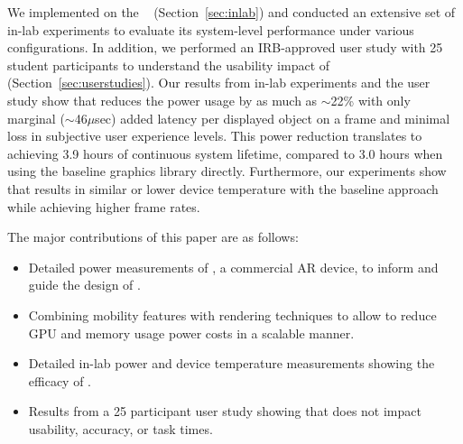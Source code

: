 We implemented {\myit} on the {\mlo}~\cite{magicleapone} (Section~\ref{sec:inlab})
and conducted an extensive set of in-lab experiments to evaluate its
system-level performance under various configurations.
%
In addition, we performed an IRB-approved user study with 25 student participants
to understand the usability impact of {\myit} (Section~\ref{sec:userstudies}).
%
%
Our results from in-lab experiments and the user study show that {\myit}
reduces the power usage by as much as $\sim$22\% 
with only marginal ($\sim$46$\mu$sec) added latency per displayed 
object on a frame and minimal loss in subjective user experience levels.
%
This power reduction translates to achieving 3.9 hours of continuous system lifetime, compared to 3.0 hours when using the baseline graphics library directly.
%
Furthermore, our experiments show that {\myit} results in similar or lower device 
temperature with the baseline approach while achieving higher frame rates.

The major contributions of this paper are as follows:

\begin{itemize}[leftmargin=*]

    \item Detailed power measurements of {\mlo}, a commercial AR device, to inform and guide the design of {\myit}.

    \item Combining mobility features with rendering techniques to allow {\myit} to reduce GPU and memory usage power costs in a scalable manner.

    \item Detailed in-lab power and device temperature measurements showing the efficacy of {\myit}.

    \item Results from a 25 participant user study showing that {\myit} does not impact usability, accuracy, or task times.

\end{itemize}




    
